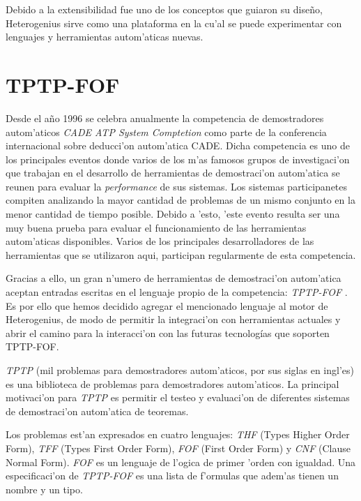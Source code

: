 Debido a la extensibilidad fue uno de los conceptos que guiaron su diseño, Heterogenius sirve como  una plataforma en la cu'al se puede experimentar con lenguajes y herramientas autom'aticas nuevas.


\section{TPTP-FOF}
\label{capitulo:TPTP-FOF}

Desde el a\~no 1996 se celebra anualmente la competencia de demostradores autom'aticos \emph{CADE ATP System Comptetion} \cite{casc} como parte de la conferencia internacional sobre deducci'on autom'atica CADE.
Dicha competencia es uno de los principales eventos donde varios de los m'as famosos grupos de investigaci'on que trabajan en el desarrollo de herramientas de demostraci'on autom'atica se reunen para evaluar la \emph{performance} de sus sistemas. Los sistemas participanetes compiten analizando la mayor cantidad de problemas de un mismo conjunto en la menor cantidad de tiempo posible. Debido a 'esto, 'este evento resulta ser una muy buena prueba para evaluar el funcionamiento de las herramientas autom'aticas disponibles. Varios de los principales desarrolladores de las herramientas que se utilizaron aqui, participan regularmente de esta competencia.

Gracias a ello, un gran n'umero de herramientas de demostraci'on autom'atica aceptan entradas escritas en el lenguaje propio de la competencia: \textit{TPTP-FOF} \cite{fof}. Es por ello que hemos decidido agregar el mencionado lenguaje al motor de Heterogenius, de modo de permitir la integraci'on con herramientas actuales y abrir el camino para la interacci'on con las futuras tecnologías que soporten TPTP-FOF.

\textit{TPTP} (mil problemas para demostradores autom'aticos, por sus siglas en ingl'es) \cite{tptp} es una biblioteca de problemas para demostradores autom'aticos. La principal motivaci'on para \textit{TPTP} es permitir el testeo y evaluaci'on de diferentes sistemas de demostraci'on autom'atica de teoremas.

Los problemas est'an expresados en cuatro lenguajes: \textit{THF} (Types Higher Order Form), \textit{TFF} (Types First Order Form), \textit{FOF} (First Order Form) y \textit{CNF} (Clause Normal Form). \textit{FOF} \cite{fof} es un lenguaje de l'ogica de primer 'orden con igualdad. Una especificaci'on de \textit{TPTP-FOF} es una lista de f'ormulas que adem'as tienen un nombre y un tipo.

